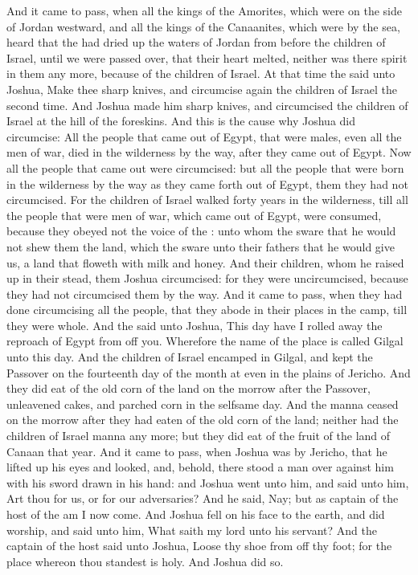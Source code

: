 \begin{biblechapter} %
\verse And it came to pass, when all the kings of the Amorites, which were on the side of Jordan westward, and all the kings of the Canaanites, which were by the sea, heard that the \LORD had dried up the waters of Jordan from before the children of Israel, until we were passed over, that their heart melted, neither was there spirit in them any more, because of the children of Israel.
 At that time the \LORD said unto Joshua, Make thee sharp knives, and circumcise again the children of Israel the second time.
\verse And Joshua made him sharp knives, and circumcised the children of Israel at the hill of the foreskins.
\verse And this is the cause why Joshua did circumcise: All the people that came out of Egypt, that were males, even all the men of war, died in the wilderness by the way, after they came out of Egypt.
\verse Now all the people that came out were circumcised: but all the people that were born in the wilderness by the way as they came forth out of Egypt, them they had not circumcised.
\verse For the children of Israel walked forty years in the wilderness, till all the people that were men of war, which came out of Egypt, were consumed, because they obeyed not the voice of the \LORD: unto whom the \LORD sware that he would not shew them the land, which the \LORD sware unto their fathers that he would give us, a land that floweth with milk and honey.
\verse And their children, whom he raised up in their stead, them Joshua circumcised: for they were uncircumcised, because they had not circumcised them by the way.
\verse And it came to pass, when they had done circumcising all the people, that they abode in their places in the camp, till they were whole.
\verse And the \LORD said unto Joshua, This day have I rolled away the reproach of Egypt from off you. Wherefore the name of the place is called Gilgal unto this day.
\verse And the children of Israel encamped in Gilgal, and kept the Passover on the fourteenth day of the month at even in the plains of Jericho.
\verse And they did eat of the old corn of the land on the morrow after the Passover, unleavened cakes, and parched corn in the selfsame day.
\verse And the manna ceased on the morrow after they had eaten of the old corn of the land; neither had the children of Israel manna any more; but they did eat of the fruit of the land of Canaan that year.
\verse And it came to pass, when Joshua was by Jericho, that he lifted up his eyes and looked, and, behold, there stood a man over against him with his sword drawn in his hand: and Joshua went unto him, and said unto him, Art thou for us, or for our adversaries?
\verse And he said, Nay; but as captain of the host of the \LORD am I now come. And Joshua fell on his face to the earth, and did worship, and said unto him, What saith my lord unto his servant?
\verse And the captain of the \LORDs host said unto Joshua, Loose thy shoe from off thy foot; for the place whereon thou standest is holy. And Joshua did so.
\end{biblechapter}

